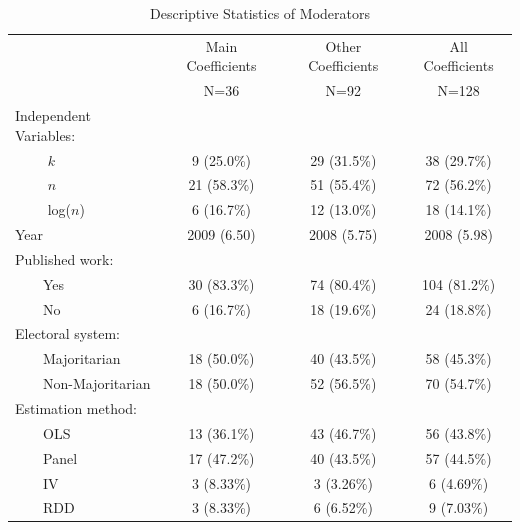 \documentclass[a4paper,12pt]{article}
\begin{document}
\begin{table}[htpb]
 \caption{Descriptive Statistics of Moderators}
 \centering
 \begin{tabular}{lccc}
\hline  \hline
& Main Coefficients & Other Coefficients &   All Coefficients    \\ 
&        N=36        &       N=92        &    N=128    \\ 
\hline     
Independent Variables: &             &                    &                  \\
$\qquad$ $k$ &    9 (25.0\%)      &     29 (31.5\%)    & 38 (29.7\%)  \\ 
$\qquad$ $n$ &      21 (58.3\%)     &    51 (55.4\%)   & 72 (56.2\%)  \\ 
$\qquad$ log($n$) &      6 (16.7\%)     &     12 (13.0\%)    & 18 (14.1\%)  \\ 
Year &     2009 (6.50)    &    2008 (5.75)   & 2008 (5.98) \\ 
Published work: &             &                    &                  \\ 
$\qquad$Yes &     30 (83.3\%)     &    74 (80.4\%)    & 104 (81.2\%) \\ 
$\qquad$No &    6 (16.7\%)       &     18 (19.6\%)   & 24 (18.8\%)  \\ 
Electoral system: &             &                    &                  \\ 
$\qquad$Majoritarian &     18 (50.0\%)      &    40 (43.5\%)   & 58 (45.3\%)  \\ 
$\qquad$Non-Majoritarian &    18 (50.0\%)       &    52 (56.5\%)   & 70 (54.7\%)  \\ 
Estimation method: &             &                    &                  \\ 
$\qquad$OLS &     13 (36.1\%)     &   43 (46.7\%)     & 56 (43.8\%)  \\ 
$\qquad$Panel &     17 (47.2\%)     &    40 (43.5\%)    & 57 (44.5\%)  \\ 
$\qquad$IV &     3 (8.33\%)      &     3 (3.26\%)    &  6 (4.69\%)  \\ 
$\qquad$RDD &     3 (8.33\%)      &     6 (6.52\%)    &  9 (7.03\%)  \\ 
\hline  
\end{tabular}
\label{tab:descriptive}
\begin{minipage}{\textwidth}
\renewcommand{\footnoterule}{}
\end{minipage}    
\end{table} 
\end{document}
